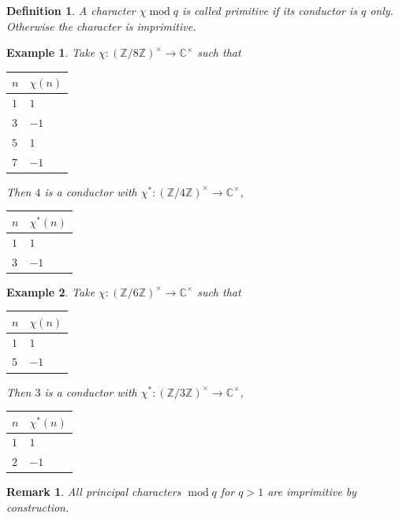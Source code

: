 \documentclass{article}
\newtheorem{definition}{Definition}[section]
\newtheorem{remark}{Remark}[section]
\newtheorem{example}{Example}[section]
\DeclareMathOperator{\tmod}{mod}
\newcommand{\Z}[0]{\mathbb{Z}}
\newcommand{\C}[0]{\mathbb{C}}
\begin{document}
\begin{definition}
  A character $\chi\tmod{q}$ is called primitive if its conductor is $q$ only. Otherwise the character is imprimitive. 
\end{definition}

\begin{example}
  Take $\chi:(\Z/8\Z)^\times\to\C^\times$ such that 
    \begin{center}
\centering
\begin{tabular}{l|l}
$n$ & $\chi(n)$ \\ \hline
$1$ & $1$       \\
$3$ & $-1$      \\
$5$ & $1$       \\
$7$ & $-1$     
\end{tabular}
\end{center}
Then $4$ is a conductor with $\chi^*:(\Z/4\Z)^\times\to\C^\times$,
    \begin{center}
\centering
\begin{tabular}{l|l}
$n$ & $\chi^*(n)$ \\ \hline
$1$ & $1$       \\
$3$ & $-1$       
\end{tabular}
\end{center}
\end{example}

\begin{example}
  Take $\chi:(\Z/6\Z)^\times\to\C^\times$ such that 
    \begin{center}
\centering
\begin{tabular}{l|l}
$n$ & $\chi(n)$ \\ \hline
$1$ & $1$       \\
$5$ & $-1$       \\
\end{tabular}
\end{center}
Then $3$ is a conductor with $\chi^*:(\Z/3\Z)^\times\to\C^\times$,
    \begin{center}
\centering
\begin{tabular}{l|l}
$n$ & $\chi^*(n)$ \\ \hline
$1$ & $1$       \\
$2$ & $-1$       
\end{tabular}
\end{center}
\end{example}

\begin{remark}
  All principal characters $\tmod {q}$ for $q>1$ are imprimitive by construction.
\end{remark}
\end{document}
